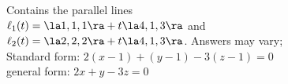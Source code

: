 {Contains the parallel lines\\
$\ell_1(t) = \la 1,1,1\ra + t\la 4,1,3\ra$ and \\
$\ell_2(t) = \la 2,2,2\ra + t\la 4,1,3\ra$.
}
{Answers may vary;\\
Standard form: $2(x-1)+(y-1)-3(z-1)=0$\\
general form: $2x+y-3z=0$
}

